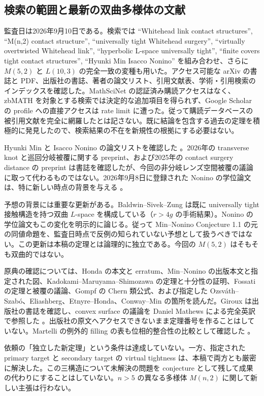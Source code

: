 \documentclass[12pt]{amsart}
\theoremstyle{definition}
\theoremstyle{remark}
\numberwithin{equation}{section}
\theoremstyle{definition}
\begin{document}
\subsection{検索の範囲と最新の双曲多様体の文献}
監査日は2026年9月10日である。検索では ``Whitehead link contact structures'', ``M(n,2) contact structure'', ``universally tight Whitehead surgery'', ``virtually overtwisted Whitehead link'', ``hyperbolic L-space universally tight'', ``finite covers tight contact structures'', ``Hyunki Min Isacco Nonino'' を組み合わせ、さらに $M(5,2)$ と $L(10,3)$ の完全一致の変種も用いた。アクセス可能な arXiv の書誌と PDF、出版社の書誌、著者の論文リスト、引用文献表、学術・引用検索のインデックスを確認した。MathSciNet の認証済み購読アクセスはなく、zbMATH を対象とする検索では決定的な追加項目を得られず、Google Scholar の profile への直接アクセスは rate limit に遭った。従って購読データベースの被引用文献を完全に網羅したとは記さない。既に結論を包含する過去の定理を積極的に発見したので、検索結果の不在を新規性の根拠にする必要はない。

Hyunki Min と Isacco Nonino の論文リストを確認した \cite{ja-websites}。2026年の transverse knot と巡回分岐被覆に関する preprint、および2025年の contact surgery distance の preprint は書誌を確認したが、今回の非分岐レンズ空間被覆の議論に取って代わるものではない。2026年9月8日に登録された Nonino の学位論文は、特に新しい時点の背景を与える \cite{ja-thesis}。

予想の背景には重要な更新がある。Baldwin--Sivek--Zung \cite[Theorem 1.4]{ja-BSZ} は既に universally tight 接触構造を持つ双曲 $L$-space を構成している（$r>4g$ の手術結果）。Nonino の学位論文もこの変化を明示的に論じる。従って Min--Nonino Conjecture 1.1 の元の同値命題を、監査日時点で反例の知られていない予想として扱うべきではない。この更新は本稿の定理とは論理的に独立である。今回の $M(5,2)$ はそもそも双曲的ではない。

原典の確認については、Honda の本文と erratum、Min--Nonino の出版本文と指定された図、Kadokami--\allowbreak Maruyama--\allowbreak Shimozawa の定理と十分性の証明、Fossati の定理と被覆の議論、Gompf の Chern 類公式、および指定した Ozsv\'ath--Szab\'o、Eliashberg、Etnyre--Honda、Conway--Min の箇所を読んだ。Giroux は出版社の書誌を確認し、convex surface の議論を Daniel Mathews による完全英訳で参照した \cite{ja-Giroux}。出版社の原文へアクセスできないまま定理番号を作ることはしていない。Martelli の例外的 filling の表も位相的整合性の比較として確認した \cite{ja-Martelli}。

依頼の「独立した新定理」という条件は達成していない。一方、指定された primary target と secondary target の virtual tightness は、本稿で両方とも厳密に解決した。この三構造について未解決の問題を conjecture として残して成果の代わりにすることはしていない。$n>5$ の異なる多様体 $M(n,2)$ に関して新しい主張は行わない。
\end{document}
